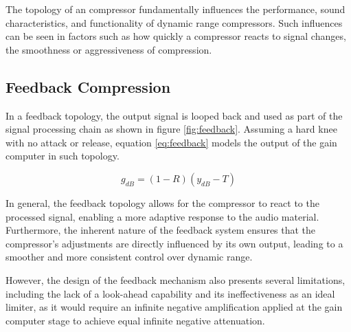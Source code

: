 \documentclass[10pt]{article}
\begin{document}
\begin{multicols*}{2}
            \noindent The topology of an compressor fundamentally influences the performance, sound characteristics, and functionality of dynamic range compressors. Such influences can be seen in factors such as how quickly a compressor reacts to signal changes, the smoothness or aggressiveness of compression.

            \subsection{Feedback Compression}
                In a feedback topology, the output signal is looped back and used as part of the signal processing chain as shown in figure \ref{fig:feedback}. Assuming a hard knee with no attack or release, equation \ref{eq:feedback} models the output of the gain computer in such topology.\par

                    \begin{equation} \label{eq:feedback}
                        g_{dB}=(1-R)(y_{dB}-T)
                    \end{equation}
                
                \noindent In general, the feedback topology allows for the compressor to react to the processed signal, enabling a more adaptive response to the audio material. Furthermore, the inherent nature of the feedback system ensures that the compressor's adjustments are directly influenced by its own output, leading to a smoother and more consistent control over dynamic range.\par
                However, the design of the feedback mechanism also presents several limitations, including the lack of a look-ahead capability and its ineffectiveness as an ideal limiter, as it would require an infinite negative amplification applied at the gain computer stage to achieve equal infinite negative attenuation.

                \vspace{2ex}

                    \noindent
                    \begin{minipage}{\linewidth}

                        \centering

\end{minipage}
\end{multicols*}
\end{document}
